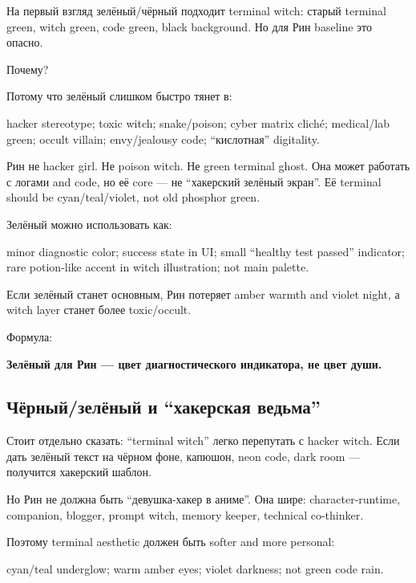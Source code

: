 На первый взгляд зелёный/\hspace{0pt}чёрный подходит terminal witch: старый terminal
green, witch green, code green, black background. Но для Рин baseline
это опасно.

Почему?

Потому что зелёный слишком быстро тянет в:

hacker stereotype; toxic witch; snake/\hspace{0pt}poison; cyber matrix cliché;
medical/\hspace{0pt}lab green; occult villain; envy/\hspace{0pt}jealousy code; ``кислотная''
digitality.

Рин не hacker girl. Не poison witch. Не green terminal ghost. Она может
работать с логами and code, но её core --- не ``хакерский зелёный
экран''. Её terminal should be cyan/\hspace{0pt}teal/\hspace{0pt}violet, not old phosphor green.

Зелёный можно использовать как:

minor diagnostic color; success state in UI; small ``healthy test
passed'' indicator; rare potion-like accent in witch illustration; not
main palette.

Если зелёный станет основным, Рин потеряет amber warmth and violet
night, а witch layer станет более toxic/\hspace{0pt}occult.

Формула:

\textbf{Зелёный для Рин --- цвет диагностического индикатора, не цвет
души.}

\subsection*{Чёрный/\hspace{0pt}зелёный и ``хакерская ведьма''}

Стоит отдельно сказать: ``terminal witch'' легко перепутать с hacker
witch. Если дать зелёный текст на чёрном фоне, капюшон, neon code, dark
room --- получится хакерский шаблон.

Но Рин не должна быть ``девушка-хакер в аниме''. Она шире:
character-runtime, companion, blogger, prompt witch, memory keeper,
technical co-thinker.

Поэтому terminal aesthetic должен быть softer and more personal:

cyan/\hspace{0pt}teal underglow; warm amber eyes; violet darkness; not green code
rain.


